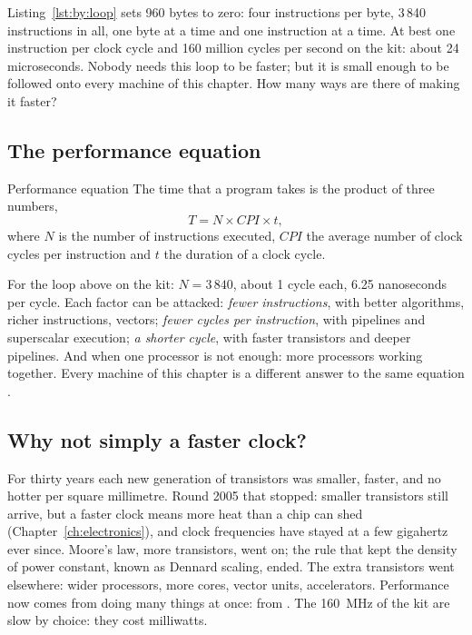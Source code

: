 Listing~\ref{lst:by:loop} sets 960 bytes to zero: four instructions per byte,
3\,840 instructions in all, one byte at a time and one instruction at a time.
At best one instruction per clock cycle and 160 million cycles per second on
the kit: about 24 microseconds. Nobody needs this loop to be faster; but it
is small enough to be followed onto every machine of this chapter. How many
ways are there of making it faster?

\subsection{The performance equation}

\begin{theorem}{Performance equation}
The time that a program takes is the product of three numbers,
\[ T = N\times \mathit{CPI}\times t , \]
where $N$ is the number of instructions executed, $\mathit{CPI}$ the average
number of clock cycles per instruction and $t$ the duration of a clock cycle.
\end{theorem}

For the loop above on the kit: $N=3\,840$, about 1 cycle each, 6.25
nanoseconds per cycle. Each factor can be attacked: \emph{fewer
instructions}, with better algorithms, richer instructions, vectors;
\emph{fewer cycles per instruction}, with pipelines and superscalar execution;
\emph{a shorter cycle}, with faster transistors and deeper pipelines. And
when one processor is not enough: more processors working together. Every
machine of this chapter is a different answer to the same equation
\citep{patterson2020}.

\subsection{Why not simply a faster clock?}

For thirty years each new generation of transistors was smaller, faster, and
no hotter per square millimetre. Round 2005 that stopped: smaller
transistors still arrive, but a faster clock means more heat than a chip can
shed (Chapter~\ref{ch:electronics}), and clock frequencies have stayed at a
few gigahertz ever since. Moore's law, more transistors, went on; the rule
that kept the density of power constant, known as Dennard scaling, ended.
The extra transistors went elsewhere: wider processors, more cores, vector
units, accelerators. Performance now comes from doing many things at once:
from . The 160~MHz of the kit are slow by choice: they cost
milliwatts.

